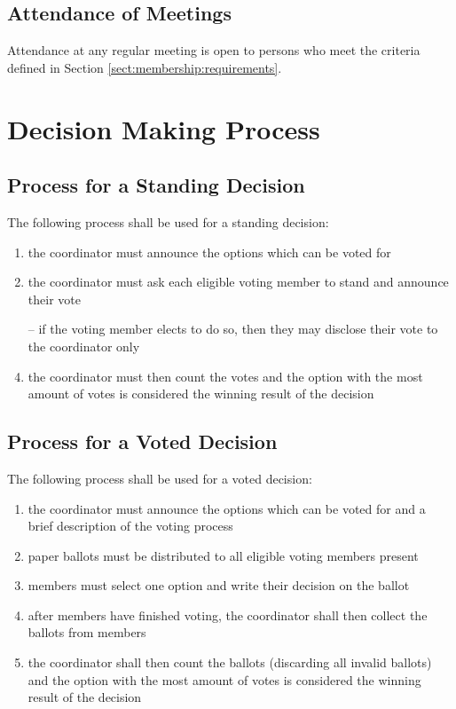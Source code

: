 \documentclass[english,11pt]{article}
\begin{document}
\subsection{Attendance of Meetings} \label{sect:meetings:attendance}
Attendance at any regular meeting is open to persons who meet the criteria defined in Section \ref{sect:membership:requirements}.

\section{Decision Making Process} \label{art:decision}

\subsection{Process for a Standing Decision} \label{sect:decision:standing}
The following process shall be used for a standing decision:

\begin{enumerate}
    \item the coordinator must announce the options which can be voted for
    \item the coordinator must ask each eligible voting member to stand and announce their vote
    \item[--] if the voting member elects to do so, then they may disclose their vote to the coordinator only
    \item the coordinator must then count the votes and the option with the most amount of votes is considered the winning result of the decision
\end{enumerate}

\subsection{Process for a Voted Decision} \label{sect:decision:voted}
The following process shall be used for a voted decision:

\begin{enumerate}
    \item the coordinator must announce the options which can be voted for and a brief description of the voting process
    \item paper ballots must be distributed to all eligible voting members present
    \item members must select one option and write their decision on the ballot
    \item after members have finished voting, the coordinator shall then collect the ballots from members
    \item the coordinator shall then count the ballots (discarding all invalid ballots) and the option with the most amount of votes is considered the winning result of the decision
\end{enumerate}
\end{document}
